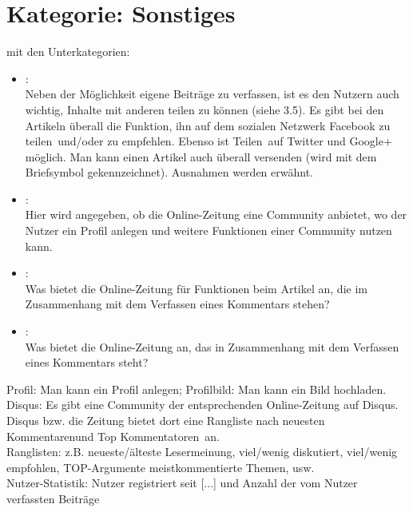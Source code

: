 \section{Kategorie: \glqq Sonstiges\grqq} 

mit den Unterkategorien:
\begin{itemize}
\item{}\grqq:\\
Neben der Möglichkeit eigene Beiträge zu verfassen, ist es den Nutzern auch wichtig, Inhalte mit anderen teilen zu können (siehe 3.5). Es gibt bei den Artikeln überall die Funktion, ihn auf dem sozialen Netzwerk Facebook zu \glqq teilen\grqq\ und/oder zu \glqq empfehlen\grqq. Ebenso ist \glqq Teilen\grqq\ auf Twitter und Google+ möglich. Man kann einen Artikel auch überall versenden (wird mit dem Briefsymbol gekennzeichnet). Ausnahmen werden erwähnt. 



\item{}\grqq: \\
Hier wird angegeben, ob die Online-Zeitung eine Community anbietet, wo der Nutzer ein Profil anlegen und weitere Funktionen einer Community nutzen kann. 


\item{}\grqq:\\
Was bietet die Online-Zeitung für Funktionen beim Artikel an, die im Zusammenhang mit dem Verfassen eines Kommentars stehen?


\item{}\grqq:\\
Was bietet die Online-Zeitung an, das in Zusammenhang mit dem Verfassen eines Kommentars steht?

\end{itemize}


Profil: Man kann ein Profil anlegen; Profilbild: Man kann ein Bild hochladen.\\
Disqus: Es gibt eine Community der entsprechenden Online-Zeitung auf Disqus. Disqus bzw. die Zeitung bietet dort eine Rangliste nach \glqq neuesten Kommentaren\grqq und  \glqq Top Kommentatoren\grqq\ an. \\
Ranglisten: z.B. neueste/älteste Lesermeinung, viel/wenig diskutiert, viel/wenig empfohlen, TOP-Argumente meistkommentierte Themen, usw. \\
Nutzer-Statistik: Nutzer registriert seit [...] und Anzahl der vom Nutzer verfassten Beiträge





